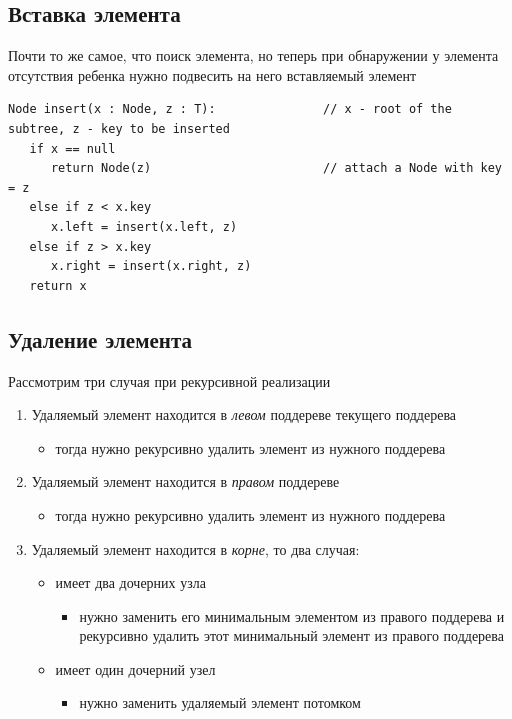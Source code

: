 \documentclass[a4paper]{article}
\begin{document}
\subsection{Вставка элемента}
Почти то же самое, что поиск элемента, но теперь при обнаружении у элемента отсутствия ребенка нужно подвесить на него вставляемый элемент
\begin{lstlisting}
Node insert(x : Node, z : T):               // x - root of the subtree, z - key to be inserted
   if x == null 
      return Node(z)                        // attach a Node with key = z
   else if z < x.key
      x.left = insert(x.left, z)
   else if z > x.key
      x.right = insert(x.right, z)
   return x
\end{lstlisting}

\subsection{Удаление элемента}
Рассмотрим три случая при рекурсивной реализации
\begin{enumerate}
    \item Удаляемый элемент находится в \textit{левом} поддереве текущего поддерева
    \begin{itemize}
        \item тогда нужно рекурсивно удалить элемент из нужного поддерева
    \end{itemize}
    \item Удаляемый элемент находится в \textit{правом} поддереве
    \begin{itemize}
        \item тогда нужно рекурсивно удалить элемент из нужного поддерева
    \end{itemize}
    \item Удаляемый элемент находится в \textit{корне}, то два случая:
    \begin{itemize}
        \item имеет два дочерних узла
        \begin{itemize}
            \item нужно заменить его минимальным элементом из правого поддерева и рекурсивно удалить этот минимальный элемент из правого поддерева
        \end{itemize}
        \item имеет один дочерний узел
        \begin{itemize}
            \item нужно заменить удаляемый элемент потомком
        \end{itemize}
    \end{itemize}
\end{enumerate}
\end{document}

